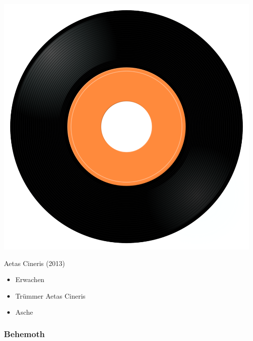 \begin{minipage}[t]{0.25\textwidth}
\captionsetup{type=figure}
\includegraphics[width=\textwidth]{Images/cover.png}
\caption*{Aetas Cineris (2013)}
\end{minipage}
\begin{minipage}[t]{0.25\textwidth}\vspace{0pt}
\begin{itemize}[nosep,leftmargin=1em,labelwidth=*,align=left]
	\setlength{\itemsep}{0pt}
	\item Erwachen
	\item Trümmer \/ Aetas Cineris
	\item Asche
\end{itemize}
\end{minipage}

\subsubsection{Behemoth}

